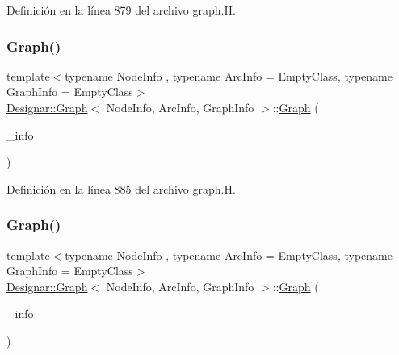 Definición en la línea 879 del archivo graph.\+H.

\mbox{\label{class_designar_1_1_graph_a61f5be7345295aa375f3a329ded36c17}} 
\subsubsection{\texorpdfstring{Graph()}{Graph()}\hspace{0.1cm}{\footnotesize\ttfamily [2/5]}}
{\footnotesize\ttfamily template$<$typename Node\+Info , typename Arc\+Info  = Empty\+Class, typename Graph\+Info  = Empty\+Class$>$ \\
\hyperlink{class_designar_1_1_graph}{Designar\+::\+Graph}$<$ Node\+Info, Arc\+Info, Graph\+Info $>$\+::\hyperlink{class_designar_1_1_graph}{Graph} (\begin{DoxyParamCaption}\item[{const Graph\+Info \&}]{\+\_\+info }\end{DoxyParamCaption})\hspace{0.3cm}{\ttfamily [inline]}}



Definición en la línea 885 del archivo graph.\+H.

\mbox{\label{class_designar_1_1_graph_a14f42f1511cc6e9edf7f54f656febf1e}} 
\subsubsection{\texorpdfstring{Graph()}{Graph()}\hspace{0.1cm}{\footnotesize\ttfamily [3/5]}}
{\footnotesize\ttfamily template$<$typename Node\+Info , typename Arc\+Info  = Empty\+Class, typename Graph\+Info  = Empty\+Class$>$ \\
\hyperlink{class_designar_1_1_graph}{Designar\+::\+Graph}$<$ Node\+Info, Arc\+Info, Graph\+Info $>$\+::\hyperlink{class_designar_1_1_graph}{Graph} (\begin{DoxyParamCaption}\item[{Graph\+Info \&\&}]{\+\_\+info }\end{DoxyParamCaption})\hspace{0.3cm}{\ttfamily [inline]}}



